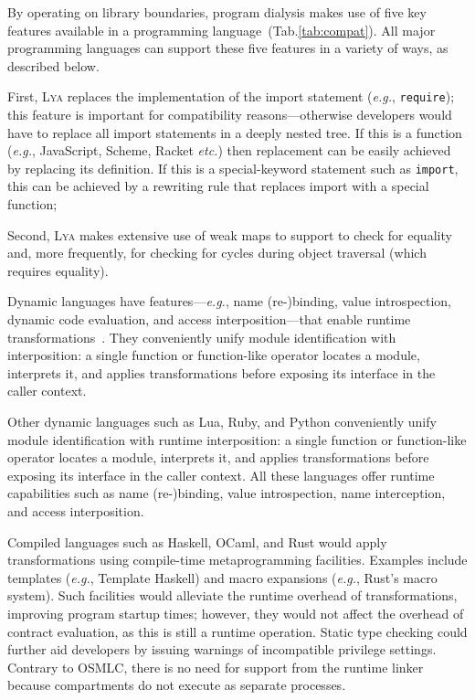 \documentclass[letterpaper,twocolumn,10pt]{article}
\def\eg{{\em e.g.}, }
\def\etc{{\em etc.}\xspace}
\newcommand{\ttt}[1]{\texttt{#1}}
\newcommand{\tb}[1]{(Tab.\ref{tab:#1})}
\newcommand{\sys}{{\scshape Lya}\xspace}
\begin{document}
By operating on library boundaries, program dialysis makes use of five key features available in a programming language~\tb{compat}.
All major programming languages can support these five features in a variety of ways, as described below.

First, \sys replaces the implementation of the import statement (\eg \ttt{require});
  this feature is important for compatibility reasons---otherwise developers would have to replace all import statements in a deeply nested tree.
If this is a function (\eg JavaScript, Scheme, Racket \etc) then replacement can be easily achieved by replacing its definition.
If this is a special-keyword statement such as \ttt{import}, this can be achieved by a rewriting rule that replaces import with a special function;

Second, \sys makes extensive use of weak maps to support to check for equality and, more frequently, for checking for cycles during object traversal (which requires equality).


Dynamic languages have features---\eg name (re-)binding, value introspection, dynamic code evaluation, and access interposition---that enable runtime transformations~\cite{aop, metaobject}.
They conveniently unify module identification with interposition: %
  a single function or function-like operator locates a module, interprets it, and applies transformations before exposing its interface in the caller context.

Other dynamic languages such as Lua, Ruby, and Python conveniently unify module identification with runtime interposition:
  a single function or function-like operator locates a module, interprets it, and applies transformations before exposing its interface in the caller context.
All these languages offer runtime capabilities such as name (re-)binding, value introspection, name interception, and access interposition.

Compiled languages such as Haskell, OCaml, and Rust would apply transformations using compile-time metaprogramming facilities.
Examples include templates (\eg Template Haskell) and macro expansions (\eg Rust's macro system).
Such facilities would alleviate the runtime overhead of transformations, improving program startup times;
  however, they would not affect the overhead of contract evaluation, as this is still a runtime operation.
Static type checking could further aid developers by issuing warnings of incompatible privilege settings.
Contrary to OSMLC, there is no need for support from the runtime linker~\cite[\S VII]{breakapp:ndss:2018} because compartments do not execute as separate processes.
\end{document}
